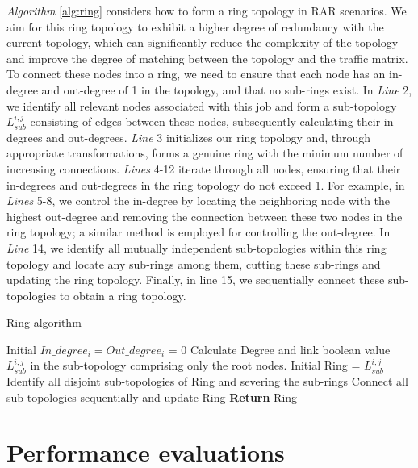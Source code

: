 \documentclass[conference]{IEEEtran}
\begin{document}
\emph{Algorithm} \ref{alg:ring} considers how to form a ring topology in RAR scenarios. We aim for this ring topology to exhibit a higher degree of redundancy with the current topology, which can significantly reduce the complexity of the topology and improve the degree of matching between the topology and the traffic matrix. To connect these nodes into a ring, we need to ensure that each node has an in-degree and out-degree of 1 in the topology, and that no sub-rings exist. In \emph{Line} 2, we identify all relevant nodes associated with this job and form a sub-topology $L_{sub}^{i,j}$ consisting of edges between these nodes, subsequently calculating their in-degrees and out-degrees. \emph{Line} 3 initializes our ring topology and, through appropriate transformations, forms a genuine ring with the minimum number of increasing connections. \emph{Lines} 4-12 iterate through all nodes, ensuring that their in-degrees and out-degrees in the ring topology do not exceed 1. For example, in \emph{Lines} 5-8, we control the in-degree by locating the neighboring node with the highest out-degree and removing the connection between these two nodes in the ring topology; a similar method is employed for controlling the out-degree. In \emph{Line} 14, we identify all mutually independent sub-topologies within this ring topology and locate any sub-rings among them, cutting these sub-rings and updating the ring topology. Finally, in line 15, we sequentially connect these sub-topologies to obtain a ring topology.

\begin{algorithm}
	\caption{Ring algorithm}
	\label{alg:ring}
	\LinesNumbered
	Initial $In\_degree_i=Out\_degree_i$ = 0\;
	Calculate Degree and link boolean value $L_{sub}^{i,j}$ in the sub-topology comprising only the root nodes.\;
	Initial Ring = $L_{sub}^{i,j}$\;
	Identify all disjoint sub-topologies of Ring and severing the sub-rings\;
	Connect all sub-topologies sequentially and update Ring\;
	\textbf{Return} Ring\;
\end{algorithm}

\section{Performance evaluations}
\end{document}
